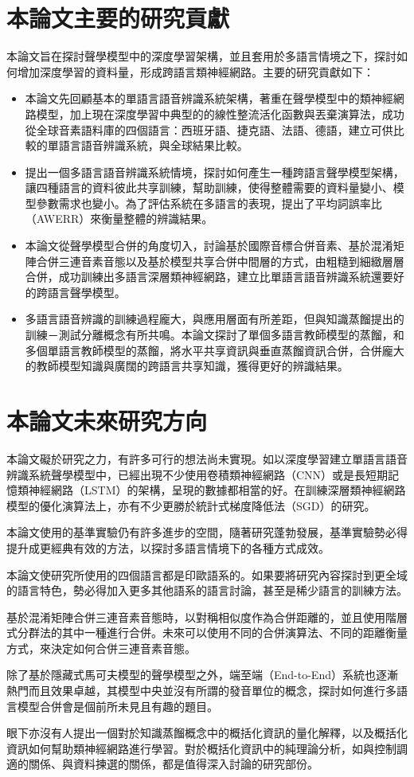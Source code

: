 \section{本論文主要的研究貢獻}

本論文旨在探討聲學模型中的深度學習架構，並且套用於多語言情境之下，探討如何增加深度學習的資料量，形成跨語言類神經網路。主要的研究貢獻如下：

\begin{itemize}
 \itemsep -2pt
 \item 本論文先回顧基本的單語言語音辨識系統架構，著重在聲學模型中的類神經網路模型，加上現在深度學習中典型的的線性整流活化函數與丟棄演算法，成功從全球音素語料庫的四個語言：西班牙語、捷克語、法語、德語，建立可供比較的單語言語音辨識系統，與全球結果比較。

 \item 提出一個多語言語音辨識系統情境，探討如何產生一種跨語言聲學模型架構，讓四種語言的資料彼此共享訓練，幫助訓練，使得整體需要的資料量變小、模型參數需求也變小。為了評估系統在多語言的表現，提出了平均詞誤率比（AWERR）來衡量整體的辨識結果。

 \item 本論文從聲學模型合併的角度切入，討論基於國際音標合併音素、基於混淆矩陣合併三連音素音態以及基於模型共享合併中間層的方式，由粗糙到細緻層層合併，成功訓練出多語言深層類神經網路，建立比單語言語音辨識系統還要好的跨語言聲學模型。

 \item 多語言語音辨識的訓練過程龐大，與應用層面有所差距，但與知識蒸餾提出的訓練－測試分離概念有所共鳴。本論文探討了單個多語言教師模型的蒸餾，和多個單語言教師模型的蒸餾，將水平共享資訊與垂直蒸餾資訊合併，合併龐大的教師模型知識與廣闊的跨語言共享知識，獲得更好的辨識結果。
\end{itemize}
\section{本論文未來研究方向}

本論文礙於研究之力，有許多可行的想法尚未實現。如以深度學習建立單語言語音辨識系統聲學模型中，已經出現不少使用卷積類神經網路（CNN）或是長短期記憶類神經網路（LSTM）的架構，呈現的數據都相當的好。在訓練深層類神經網路模型的優化演算法上，亦有不少更勝於統計式梯度降低法（SGD）的研究。

本論文使用的基準實驗仍有許多進步的空間，隨著研究蓬勃發展，基準實驗勢必得提升成更經典有效的方法，以探討多語言情境下的各種方式成效。

本論文使研究所使用的四個語言都是印歐語系的。如果要將研究內容探討到更全域的語言特色，勢必得加入更多其他語系的語言討論，甚至是稀少語言的訓練方法。

基於混淆矩陣合併三連音素音態時，以對稱相似度作為合併距離的，並且使用階層式分群法的其中一種進行合併。未來可以使用不同的合併演算法、不同的距離衡量方式，來決定如何合併三連音素音態。

除了基於隱藏式馬可夫模型的聲學模型之外，端至端（End-to-End）系統也逐漸熱門而且效果卓越，其模型中央並沒有所謂的發音單位的概念，探討如何進行多語言模型合併會是個前所未見且有趣的題目。

眼下亦沒有人提出一個對於知識蒸餾概念中的概括化資訊的量化解釋，以及概括化資訊如何幫助類神經網路進行學習。對於概括化資訊中的純理論分析，如與控制調適的關係、與資料揀選的關係，都是值得深入討論的研究部份。

